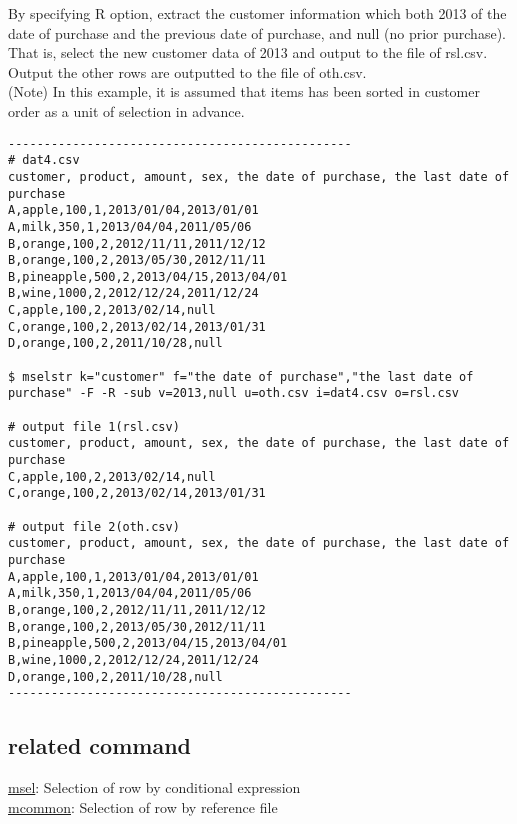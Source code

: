 \documentclass[a4paper]{jarticle}
\begin{document}
By specifying R option, extract the customer information which both 2013 of the date of purchase and the previous date of purchase, and null (no prior purchase).
That is, select the new customer data of 2013 and output to the file of rsl.csv. 
Output the other rows are outputted to the file of oth.csv.\\
(Note) In this example, it is assumed that items has been sorted in customer order as a unit of selection in advance.
\begin{verbatim}
------------------------------------------------
# dat4.csv
customer, product, amount, sex, the date of purchase, the last date of purchase
A,apple,100,1,2013/01/04,2013/01/01
A,milk,350,1,2013/04/04,2011/05/06
B,orange,100,2,2012/11/11,2011/12/12
B,orange,100,2,2013/05/30,2012/11/11
B,pineapple,500,2,2013/04/15,2013/04/01
B,wine,1000,2,2012/12/24,2011/12/24
C,apple,100,2,2013/02/14,null
C,orange,100,2,2013/02/14,2013/01/31
D,orange,100,2,2011/10/28,null

$ mselstr k="customer" f="the date of purchase","the last date of purchase" -F -R -sub v=2013,null u=oth.csv i=dat4.csv o=rsl.csv

# output file 1(rsl.csv)
customer, product, amount, sex, the date of purchase, the last date of purchase
C,apple,100,2,2013/02/14,null
C,orange,100,2,2013/02/14,2013/01/31

# output file 2(oth.csv)
customer, product, amount, sex, the date of purchase, the last date of purchase
A,apple,100,1,2013/01/04,2013/01/01
A,milk,350,1,2013/04/04,2011/05/06
B,orange,100,2,2012/11/11,2011/12/12
B,orange,100,2,2013/05/30,2012/11/11
B,pineapple,500,2,2013/04/15,2013/04/01
B,wine,1000,2,2012/12/24,2011/12/24
D,orange,100,2,2011/10/28,null
------------------------------------------------
\end{verbatim}

\subsection*{related command}
\noindent
\href{run:msel.pdf}{msel}: Selection of row by conditional expression\\
\href{run:mcommon.pdf}{mcommon}: Selection of row by reference file
\end{document}
